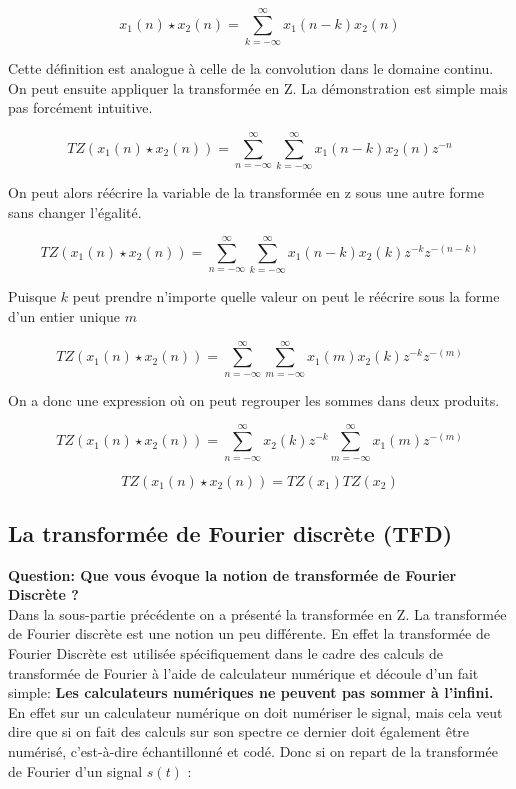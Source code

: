 \documentclass[11pt,a4paper]{article}
\begin{document}
\[ x_1(n) \star x_2(n)=  \sum_{k = -\infty}^{\infty} x_1(n-k)x_2(n) \]

Cette définition est analogue à celle de la convolution dans le domaine continu. On peut ensuite appliquer la transformée en Z. La démonstration est simple mais pas forcément intuitive.

\[ TZ(x_1(n) \star x_2(n)) = \sum_{n = -\infty}^{\infty} \sum_{k = -\infty}^{\infty} x_1(n-k)x_2(n) z^{-n}\]

On peut alors réécrire la variable de la transformée en z sous une autre forme sans changer l'égalité.

\[ TZ(x_1(n) \star x_2(n)) = \sum_{n = -\infty}^{\infty} \sum_{k = -\infty}^{\infty} x_1(n-k)x_2(k) z^{-k}  z^{-(n-k)}\]

Puisque $k$ peut prendre n'importe quelle valeur on peut le réécrire sous la forme d'un entier unique $m$ 

\[ TZ(x_1(n) \star x_2(n)) = \sum_{n = -\infty}^{\infty} \sum_{m = -\infty}^{\infty} x_1(m)x_2(k) z^{-k}  z^{-(m)}\]

On a donc une expression où on peut regrouper les sommes dans deux produits.

\[ TZ(x_1(n) \star x_2(n)) = \sum_{n = -\infty}^{\infty} x_2(k)z^{-k} \sum_{m = -\infty}^{\infty} x_1(m)   z^{-(m)}\]

\[ TZ(x_1(n) \star x_2(n)) = TZ(x_1) TZ(x_2)\]

\subsection{La transformée de Fourier discrète (TFD)}

\textbf{Question: Que vous évoque la notion de transformée de Fourier Discrète ?}\\

Dans la sous-partie précédente on a présenté la transformée en Z. La transformée de Fourier discrète est une notion un peu différente. En effet la transformée de Fourier Discrète est utilisée spécifiquement dans le cadre des calculs de transformée de Fourier à l'aide de calculateur numérique et découle d'un fait simple: \textbf{Les calculateurs numériques ne peuvent pas sommer à l'infini.}\\

En effet sur un calculateur numérique on doit numériser le signal, mais cela veut dire que si on fait des calculs sur son spectre ce dernier doit également être numérisé, c'est-à-dire échantillonné et codé. Donc si on repart de la transformée de Fourier d'un signal $s(t)$ :\\
\end{document}
